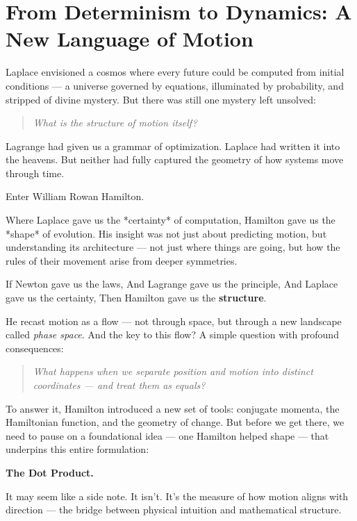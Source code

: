 \section{From Determinism to Dynamics: A New Language of Motion}

Laplace envisioned a cosmos where every future could be computed from initial conditions — a universe governed by equations, illuminated by probability, and stripped of divine mystery.  
But there was still one mystery left unsolved:

\begin{quote}
\textit{What is the structure of motion itself?}
\end{quote}

Lagrange had given us a grammar of optimization. Laplace had written it into the heavens. But neither had fully captured the geometry of how systems move through time.

Enter William Rowan Hamilton.

Where Laplace gave us the *certainty* of computation, Hamilton gave us the *shape* of evolution. His insight was not just about predicting motion, but understanding its architecture — not just where things are going, but how the rules of their movement arise from deeper symmetries.

If Newton gave us the laws,  
And Lagrange gave us the principle,  
And Laplace gave us the certainty,  
Then Hamilton gave us the \textbf{structure}.

He recast motion as a flow — not through space, but through a new landscape called \textit{phase space}. And the key to this flow? A simple question with profound consequences:

\begin{quote}
\textit{What happens when we separate position and motion into distinct coordinates — and treat them as equals?}
\end{quote}

To answer it, Hamilton introduced a new set of tools: conjugate momenta, the Hamiltonian function, and the geometry of change. But before we get there, we need to pause on a foundational idea — one Hamilton helped shape — that underpins this entire formulation:

\vspace{1em}
\begin{center}
\Large\textbf{The Dot Product.}
\end{center}

It may seem like a side note. It isn’t.  
It’s the measure of how motion aligns with direction — the bridge between physical intuition and mathematical structure.

